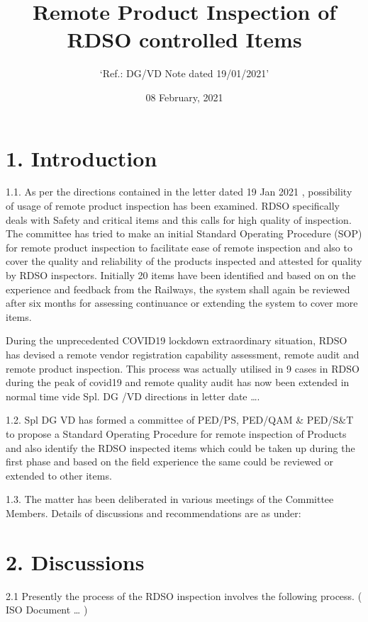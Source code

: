\documentclass[
]{article}
\title{Remote Product Inspection of RDSO controlled Items}
\subtitle{`Ref.: DG/VD Note dated 19/01/2021'}
\author{}
\date{\vspace{-2.5em}08 February, 2021}
\begin{document}
\maketitle

\hypertarget{introduction}{%
\section{1. Introduction}\label{introduction}}

1.1. As per the directions contained in the letter dated 19 Jan 2021 ,
possibility of usage of remote product inspection has been examined.
RDSO specifically deals with Safety and critical items and this calls
for high quality of inspection. The committee has tried to make an
initial Standard Operating Procedure (SOP) for remote product inspection
to facilitate ease of remote inspection and also to cover the quality
and reliability of the products inspected and attested for quality by
RDSO inspectors. Initially 20 items have been identified and based on on
the experience and feedback from the Railways, the system shall again be
reviewed after six months for assessing continuance or extending the
system to cover more items.

During the unprecedented COVID19 lockdown extraordinary situation, RDSO
has devised a remote vendor registration capability assessment, remote
audit and remote product inspection. This process was actually utilised
in 9 cases in RDSO during the peak of covid19 and remote quality audit
has now been extended in normal time vide Spl. DG /VD directions in
letter date \ldots.

1.2. Spl DG VD has formed a committee of PED/PS, PED/QAM \& PED/S\&T to
propose a Standard Operating Procedure for remote inspection of Products
and also identify the RDSO inspected items which could be taken up
during the first phase and based on the field experience the same could
be reviewed or extended to other items.

1.3. The matter has been deliberated in various meetings of the
Committee Members. Details of discussions and recommendations are as
under:

\hypertarget{discussions}{%
\section{2. Discussions}\label{discussions}}

2.1 Presently the process of the RDSO inspection involves the following
process. ( ISO Document \ldots{} )
\end{document}
